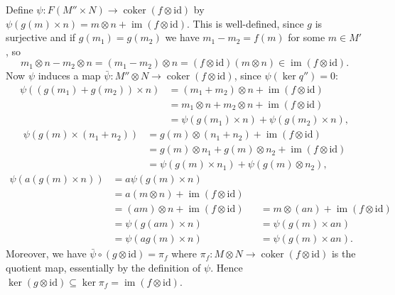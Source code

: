 \documentclass{report}
\newcommand{\induced}[1]{\bar{#1}} %
\newcommand{\id}{{\mathrm{id}}} %
\DeclareMathOperator{\im}{im}
\DeclareMathOperator{\coker}{coker}
\begin{document}
\begin{enumerate}[label=\textbf{1.3.\Alph*.}]
	      Define $\psi:F(M''\times N)\to\coker(f\otimes\id)$
	      by $\psi(g(m)\times n)=m\otimes n+\im(f\otimes\id)$. This is
	      well-defined, since $g$ is surjective and if $g(m_1)=g(m_2)$ we have
	      $m_1-m_2=f(m)$ for some $m\in M'$, so
	      \begin{equation*}
		      m_1\otimes n - m_2\otimes n
		      = (m_1-m_2)\otimes n
		      = (f\otimes\id)(m\otimes n) \in \im(f\otimes\id).
	      \end{equation*}
	      Now $\psi$ induces a map $\induced\psi:M''\otimes N\to\coker(f\otimes\id)$,
	      since $\psi(\ker q'')=0$:
	      \begin{align*}
		      \psi((g(m_1)+g(m_2))\times n)
		       & = (m_1+m_2)\otimes n + \im(f\otimes\id)          \\
		       & = m_1\otimes n + m_2\otimes n + \im(f\otimes\id) \\
		       & = \psi(g(m_1)\times n)
		      + \psi(g(m_2)\times n),
	      \end{align*}
	      \begin{align*}
		      \psi(g(m)\times(n_1+n_2))
		       & = g(m)\otimes(n_1+n_2) + \im(f\otimes\id)              \\
		       & = g(m)\otimes n_1 + g(m)\otimes n_2 + \im(f\otimes\id) \\
		       & = \psi(g(m)\times n_1)
		      + \psi(g(m)\otimes n_2),
	      \end{align*}
	      \begin{align*}
		      \psi(a(g(m)\times n))
		       & = a\psi(g(m)\times n)                                                  \\
		       & = a(m\otimes n) + \im(f\otimes\id)                                     \\
		       & = (am)\otimes n + \im(f\otimes\id)
		       &                                    & = m\otimes(an) + \im(f\otimes\id) \\
		       & = \psi(g(am)\times n)
		       &                                    & = \psi(g(m)\times an)             \\
		       & = \psi(ag(m)\times n)
		       &                                    & = \psi(g(m)\times an).
	      \end{align*}
	      Moreover, we have $\induced\psi\circ(g\otimes\id)=\pi_f$ where
	      $\pi_f:M\otimes N\to\coker(f\otimes\id)$ is the quotient map,
	      essentially by the definition of $\psi$. Hence
	      $\ker(g\otimes\id)\subseteq\ker\pi_f=\im(f\otimes\id)$.


\end{enumerate}
\end{document}
